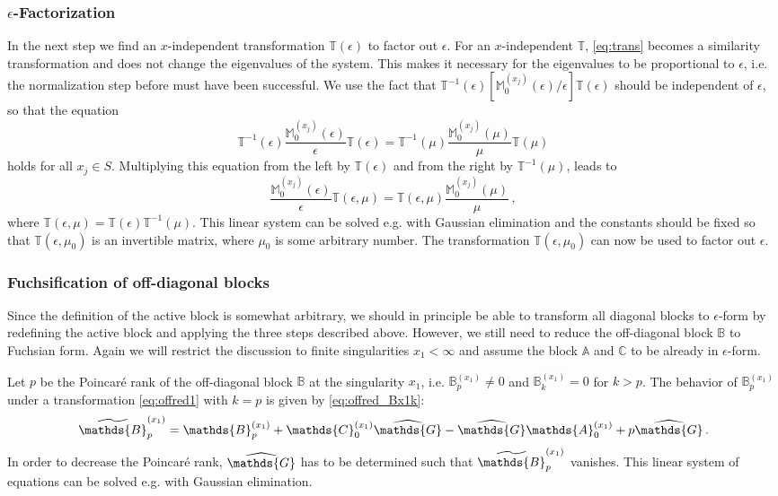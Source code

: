 \documentclass[12pt]{article}
\numberwithin{equation}{section}
\numberwithin{figure}{section}
\newcommand{\M}{\mathds{M}}
\newcommand{\A}{\mathds{A}}
\newcommand{\B}{\mathds{B}}
\newcommand{\C}{\mathds{C}}
\newcommand{\G}{\mathds{G}}
\newcommand{\T}{\mathds{T}}
\begin{document}
      \subsubsection*{$\epsilon$-Factorization}
				In the next step we find an $x$-independent transformation $\T(\epsilon)$ to factor out $\epsilon$.
        For an $x$-independent $\T$, \eqref{eq:trans} becomes a similarity transformation and does not change the eigenvalues of the system.
				This makes it necessary for the eigenvalues to be proportional to $\epsilon$, i.e. the normalization step before must have been successful.
        We use the fact that $\T^{-1}(\epsilon) [\M^{(x_j)}_0(\epsilon)/\epsilon] \T(\epsilon)$ should be independent of $\epsilon$, so that the equation 
        \[
          \T^{-1}(\epsilon) \frac{\M^{(x_j)}_0(\epsilon)}\epsilon \T(\epsilon)
          =
          \T^{-1}(\mu) \frac{\M^{(x_j)}_0(\mu)}\mu \T(\mu)
        \]
        holds for all $x_j \in S$.
        Multiplying this equation from the left by $\T(\epsilon)$ and from the right by $\T^{-1}(\mu)$, leads to
        \begin{equation} \label{eq:epfact}
          \frac{\M^{(x_j)}_0(\epsilon)}\epsilon \T(\epsilon,\mu)
          =
          \T(\epsilon,\mu) \frac{\M^{(x_j)}_0(\mu)}\mu\,,
        \end{equation}
        where $\T(\epsilon,\mu) = \T(\epsilon)\T^{-1}(\mu)$.
        This linear system can be solved e.g. with Gaussian elimination and the constants should be fixed so that $\T(\epsilon,\mu_0)$ is an invertible matrix, where $\mu_0$ is some arbitrary number.
        The transformation $\T(\epsilon,\mu_0)$ can now be used to factor out $\epsilon$.

      \subsubsection*{Fuchsification of off-diagonal blocks}
				Since the definition of the active block is somewhat arbitrary, we should in principle be able to transform all diagonal blocks to $\epsilon$-form by redefining the active block and applying the three steps described above.
				However, we still need to reduce the off-diagonal block $\B$ to Fuchsian form.
        Again we will restrict the discussion to finite singularities $x_1<\infty$ and assume the block $\A$ and $\C$ to be already in $\epsilon$-form.
       
        Let $p$ be the Poincar\'{e} rank of the off-diagonal block $\B$ at the singularity $x_1$, i.e. $\B^{(x_1)}_p \neq 0$ and $\B^{(x_1)}_k = 0$ for $k>p$.
        The behavior of $\B^{(x_1)}_p$ under a transformation \eqref{eq:offred1} with $k=p$ is given by \eqref{eq:offred_Bx1k}:
        \[
          \widetilde\B^{(x_1)}_p = 
            \B^{(x_1)}_p
            + \C_0^{(x_1)}\widehat\G - \widehat\G\A_0^{(x_1)} 
            + p\widehat\G\,.
        \]
        In order to decrease the Poincar\'{e} rank, $\widehat\G$ has to be determined such that $\widetilde\B^{(x_1)}_p$ vanishes.
        This linear system of equations can be solved e.g. with Gaussian elimination.
       
\end{document}
